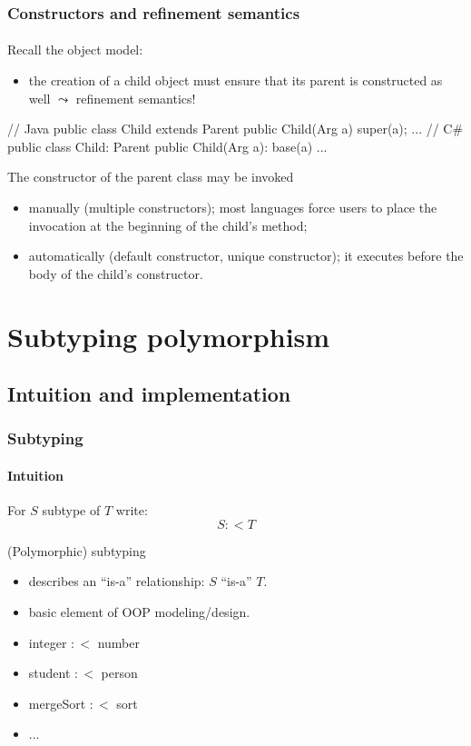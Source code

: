 \documentclass{beamer}
\begin{document}
\begin{frame}[fragile]
\frametitle{Constructors and refinement semantics}
\framesubtitle{}
Recall the object model: 
\begin{itemize}
\item
the creation of a child object must ensure that its parent is
constructed as well $\leadsto$ refinement semantics!
\end{itemize}

\begin{cplus3}
// Java 
public class Child extends Parent {
   public Child(Arg a) { super(a); ... }
} 
// C#
public class Child: Parent {
   public Child(Arg a): base(a) {...}
}
\end{cplus3}

The constructor of the parent class may be invoked 
\begin{itemize}
\item manually  (multiple constructors); most languages force
users to place the invocation at the beginning
of the child's method;
\item automatically (default constructor, unique constructor);
it executes before the body of the child's constructor.

\end{itemize}


\end{frame}

\section{Subtyping polymorphism}

\subsection{Intuition and implementation}

\begin{frame}[fragile]
\frametitle{Subtyping}
\framesubtitle{Intuition}

For $S$ subtype of $T$ write:
\[
    S :< T
\]

(Polymorphic) subtyping 
\begin{itemize}
\item describes an ``is-a'' relationship: $S$ ``is-a'' $T$. 
\item basic element of OOP modeling/design.
\end{itemize}

\pause

\begin{example}
\begin{itemize}
  \item integer $:<$ number
  \item student $:<$ person
  \item mergeSort $:<$ sort
  \item ...
\end{itemize}
\end{example}

\end{frame}
\end{document}
